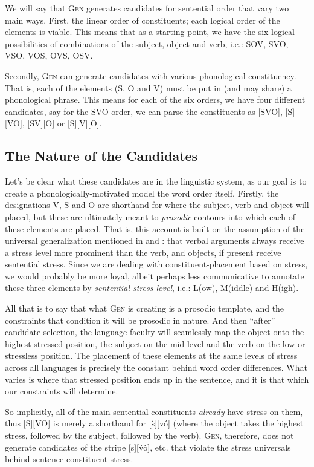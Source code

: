 \documentclass{article}
\begin{document}
We will say that \textsc{Gen} generates candidates for sentential order that vary two main ways.
First, the linear order of constituents; each logical order of the elements is viable.
This means that as a starting point, we have the six logical possibilities of combinations of the subject, object and verb, i.e.: SOV, SVO, VSO, VOS, OVS, OSV.

Secondly, \textsc{Gen} can generate candidates with various phonological constituency.
That is, each of the elements (S, O and V) must be put in (and may share) a phonological phrase.
This means for each of the six orders, we have four different candidates, say for the SVO order, we can parse the constituents as [SVO], [S][VO], [SV][O] or [S][V][O].

\subsection{The Nature of the Candidates}

Let's be clear what these candidates are in the linguistic system, as our goal is to create a phonologically-motivated model the word order itself.
Firstly, the designations V, S and O are shorthand for where the subject, verb and object will placed, but these are ultimately meant to \emph{prosodic} contours into which each of these elements are placed.
That is, this account is built on the assumption of the universal generalization mentioned in \textcite{gundel88} and \textcite{kahnemuyipour05}: that verbal arguments always receive a stress level more prominent than the verb, and objects, if present receive sentential stress.
Since we are dealing with constituent-placement based on stress, we would probably be more loyal, albeit perhaps less communicative to annotate these three elements by \emph{sentential stress level}, i.e.: L(ow), M(iddle) and H(igh).

All that is to say that what \textsc{Gen} is creating is a prosodic template, and the constraints that condition it will be prosodic in nature.
And then ``after'' candidate-selection, the language faculty will seamlessly map the object onto the highest stressed position, the subject on the mid-level and the verb on the low or stressless position.
The placement of these elements at the same levels of stress across all languages is precisely the constant behind word order differences.
What varies is where that stressed position ends up in the sentence, and it is that which our constraints will determine.

So implicitly, all of the main sentential constituents \emph{already} have stress on them, thus [S][VO] is merely a shorthand for [{\`s}][v\'o] (where the object takes the highest stress, followed by the subject, followed by the verb).
\textsc{Gen}, therefore, does not generate candidates of the stripe [s][\'v\`o], etc. that violate the stress universals behind sentence constituent stress.
\end{document}
